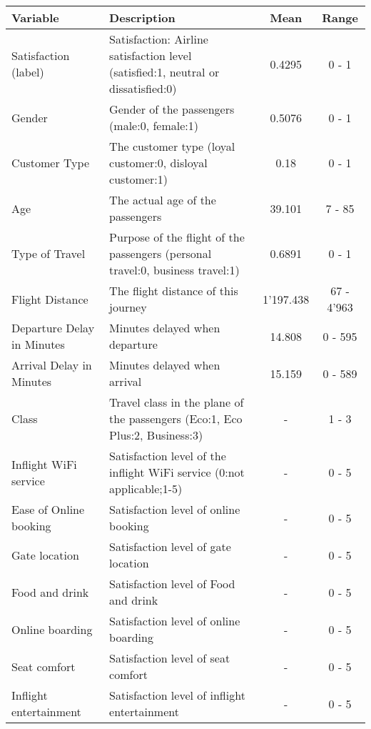   \begin{landscape}
  \pagestyle{empty}
  \begin{table}[h]
    \centering
    \begin{tabular}{|l|L|c|c|}
      \hline
      \textbf{Variable} & \textbf{Description} & \textbf{Mean} & \textbf{Range} \\
      \hline
      Satisfaction (label) & Satisfaction: Airline satisfaction level (satisfied:1, 
      neutral or dissatisfied:0) & 0.4295 & 0 - 1 \\\hline
      Gender & Gender of the passengers (male:0, female:1) & 0.5076 & 0 - 1
      \\\hline 
      Customer Type & The customer type (loyal customer:0, disloyal customer:1) 
      & 0.18 & 0 - 1 \\\hline
      Age & The actual age of the passengers & 39.101 & 7 - 85 \\\hline
      Type of Travel & Purpose of the flight of the passengers
      (personal travel:0, business travel:1) & 0.6891 & 0 - 1 \\\hline
      Flight Distance & The flight distance of this journey &
      1'197.438 & 67 - 4'963 \\\hline
      Departure Delay in Minutes & Minutes delayed when departure & 14.808 & 0 - 595 \\\hline
      Arrival Delay in Minutes & Minutes delayed when arrival & 15.159 & 0 -
      589 \\\hline
      Class & Travel class in the plane of the passengers (Eco:1, Eco Plus:2, 
      Business:3) & - & 1 - 3 \\\hline
      Inflight WiFi service & Satisfaction level of the inflight WiFi service
      (0:not applicable;1-5) & - & 0 - 5 \\\hline
      Ease of Online booking & Satisfaction level of online booking & - & 0 - 5
      \\\hline
      Gate location & Satisfaction level of gate location & - & 0 - 5 \\\hline
      Food and drink & Satisfaction level of Food and drink & - & 0 - 5
      \\\hline
      Online boarding & Satisfaction level of online boarding & - & 0 - 5
      \\\hline
      Seat comfort & Satisfaction level of seat comfort & - & 0 - 5 \\\hline
      Inflight entertainment & Satisfaction level of inflight entertainment & -
                             & 0 - 5 \\\hline

\end{tabular}
\end{table}
\end{landscape}
